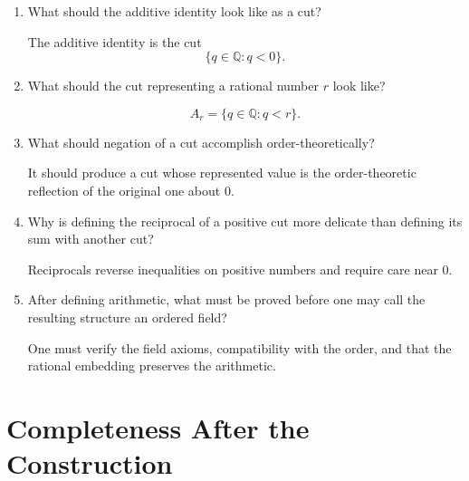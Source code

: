 \documentclass{essay}
\begin{document}
\begin{enumerate}[label=\arabic*., itemsep=10pt]
\item What should the additive identity look like as a cut?

\begin{answer}
The additive identity is the cut
\[
\{q\in\mathbb{Q}:q<0\}.
\]
\end{answer}

\item What should the cut representing a rational number $r$ look like?

\begin{answer}
\[
A_r=\{q\in\mathbb{Q}:q<r\}.
\]
\end{answer}

\item What should negation of a cut accomplish order-theoretically?

\begin{answer}
It should produce a cut whose represented value is the order-theoretic reflection of the original one about $0$.
\end{answer}

\item Why is defining the reciprocal of a positive cut more delicate than defining its sum with another cut?

\begin{answer}
Reciprocals reverse inequalities on positive numbers and require care near $0$.
\end{answer}

\item After defining arithmetic, what must be proved before one may call the resulting structure an ordered field?

\begin{answer}
One must verify the field axioms, compatibility with the order, and that the rational embedding preserves the arithmetic.
\end{answer}

\end{enumerate}

\section{Completeness After the Construction}
\end{document}

